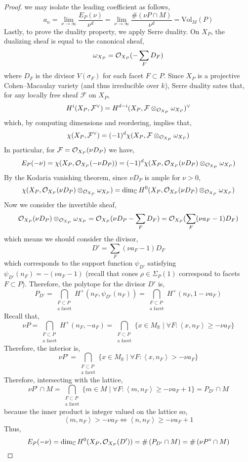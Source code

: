 \documentclass[12pt]{extarticle}
\newcommand{\R}{\mathbb{R}}
\newcommand{\C}{\mathbb{C}}
\theoremstyle{definition}
\newcommand{\F}{\mathcal{F}}
\newcommand{\Vol}[2]{\mathrm{Vol}_{#1}\left( #2 \right)}
\newcommand{\inner}[2]{\left< #1, #2 \right>}
\begin{document}
\begin{proof}
we may isolate the leading coefficient as follows,
\[ a_n = \lim_{\nu \to \infty} \frac{E_P(\nu)}{\nu^d} = \lim_{\nu \to \infty} \frac{\# \left( \nu P \cap M \right)}{\nu^d} = \Vol{M}{P} \] 
Lastly, to prove the duality property, we apply Serre duality. On $X_P$, the dualizing sheaf is equal to the canonical sheaf,
\[ \omega_{X_P} = \mathcal{O}_{X_P}( - \sum_F D_F) \]
where $D_F$ is the divisor $V(\sigma_F)$ for each facet $F \subset P$. Since $X_P$ is a projective Cohen–Macaulay variety (and thus irreducible over $k$), Serre duality sates that, for any locally free sheaf $\F$ on $X_P$,
\[ H^i(X_P, \F^\vee) = H^{d - i}(X_P, \F \otimes_{\struct{X_P}} \omega_{X_P})^\vee \]
which, by computing dimensions and reordering, implies that,
\[ \chi(X_P, \F^\vee) = (-1)^d \chi(X_P, \F \otimes_{\struct{X_P}} \omega_{X_P}) \]
In particular, for $\F = \struct{X_P}(\nu D_P)$ we have,
\[ E_P(-\nu) = \chi(X_P, \mathcal{O}_{X_P}(- \nu D_P)) = (-1)^d \chi(X_P, \mathcal{O}_{X_P}(\nu D_P) \otimes_{\mathcal{O}_{X_P}} \omega_{X_P}) \]
By the Kodaria vanishing theorem, since $\nu D_P$ is ample for $\nu > 0$, 
\[ \chi(X_P, \struct{X_P}(\nu D_P) \otimes_{\struct{X_P}} \omega_{X_P}) = \dim_\C H^0(X_P, \struct{X_P}(\nu D_P) \otimes_{\struct{X_P}} \omega_{X_P}) \]
Now we consider the invertible sheaf,
\[ \mathcal{O}_{X_P}(\nu D_P) \otimes_{\mathcal{O}_{X_P}} \omega_{X_P} = \mathcal{O}_{X_P}(\nu D_P - \sum_F D_F) = \mathcal{O}_{X_P}(\sum_F (\nu a_F - 1) D_F) \]
which means we should consider the divisor,
\[ D' = \sum_F (\nu a_F - 1) D_F \]
which corresponds to the support function $\psi_{D'}$ satisfying $\psi_{D'}(n_F) = -(\nu a_F - 1)$ (recall that cones $\rho \in \Sigma_P(1)$ correspond to facets $F \subset P$). Therefore, the polytope for the divisor $D'$ is,
\[ P_{D'} = \bigcap_{\substack{F \subset P \\ \text{a facet}}} H^+(n_F, \psi_{D'}(n_F)) = \bigcap_{\substack{F \subset P \\ \text{a facet}}} H^+(n_F, 1 - \nu a_F) \]
Recall that,
\[ \nu P = \bigcap_{\substack{F \subset P \\ \text{a facet}}} H^+(n_F, -a_F) = \bigcap_{\substack{F \subset P \\ \text{a facet}}} \{ x \in M_\R \mid \forall F : \inner{x}{n_F} \ge - \nu a_F \} \]
Therefore, the interior is,
\[ \nu P^\circ  = \bigcap_{\substack{F \subset P \\ \text{a facet}}} \{ x \in M_\R \mid \forall F : \inner{x}{n_F} > - \nu a_F \} \]
Therefore, intersecting with the lattice,
\[ \nu P^\circ \cap M = \bigcap_{\substack{F \subset P \\ \text{a facet}}} \{ m \in M \mid \forall F : \inner{m}{n_F} \ge - \nu a_F + 1 \} = P_{D'} \cap M \]
because the inner product is integer valued on the lattice so,
\[ \inner{m}{n_F} > - \nu a_F \iff \inner{n}{n_F} \ge - \nu a_F + 1 \]
Thus,
\[ E_P(-\nu) = \dim_{\C} H^0(X_P, \struct{X_P}(D')) = \# \left( P_{D'} \cap M \right) = \# \left( \nu P^\circ \cap M \right) \]
\end{proof}
\end{document}
